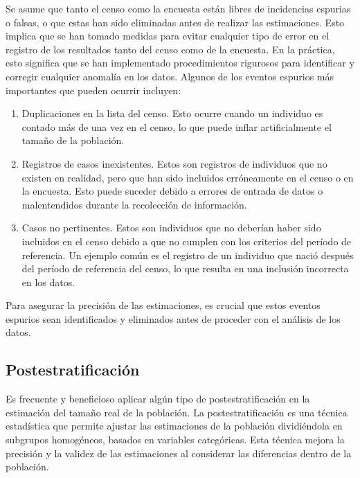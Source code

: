 \documentclass[
  12pt,
]{book}
\providecommand{\tightlist}{%
  \setlength{\itemsep}{0pt}\setlength{\parskip}{0pt}}
\begin{document}
Se asume que tanto el censo como la encuesta están libres de incidencias espurias o falsas, o que estas han sido eliminadas antes de realizar las estimaciones. Esto implica que se han tomado medidas para evitar cualquier tipo de error en el registro de los resultados tanto del censo como de la encuesta. En la práctica, esto significa que se han implementado procedimientos rigurosos para identificar y corregir cualquier anomalía en los datos. Algunos de los eventos espurios más importantes que pueden ocurrir incluyen:

\begin{enumerate}
\def\labelenumi{\arabic{enumi}.}
\tightlist
\item
  Duplicaciones en la lista del censo. Esto ocurre cuando un individuo es contado más de una vez en el censo, lo que puede inflar artificialmente el tamaño de la población.
\item
  Registros de casos inexistentes. Estos son registros de individuos que no existen en realidad, pero que han sido incluidos erróneamente en el censo o en la encuesta. Esto puede suceder debido a errores de entrada de datos o malentendidos durante la recolección de información.
\item
  Casos no pertinentes. Estos son individuos que no deberían haber sido incluidos en el censo debido a que no cumplen con los criterios del período de referencia. Un ejemplo común es el registro de un individuo que nació después del período de referencia del censo, lo que resulta en una inclusión incorrecta en los datos.
\end{enumerate}

Para asegurar la precisión de las estimaciones, es crucial que estos eventos espurios sean identificados y eliminados antes de proceder con el análisis de los datos.

\subsection{Postestratificación}\label{postestratificaciuxf3n}

Es frecuente y beneficioso aplicar algún tipo de postestratificación en la estimación del tamaño real de la población. La postestratificación es una técnica estadística que permite ajustar las estimaciones de la población dividiéndola en subgrupos homogéneos, basados en variables categóricas. Esta técnica mejora la precisión y la validez de las estimaciones al considerar las diferencias dentro de la población.
\end{document}
